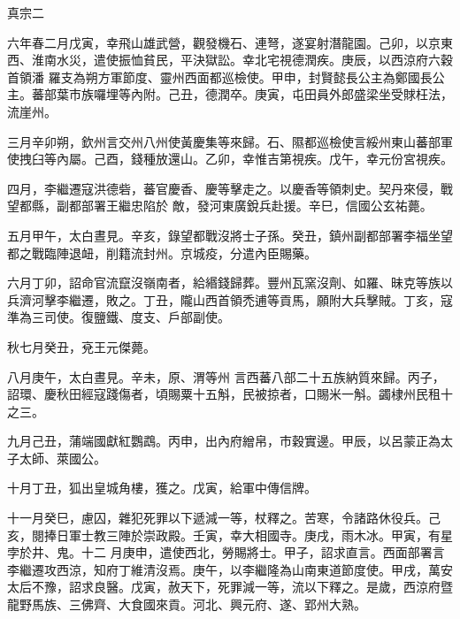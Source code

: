 
\begin{pinyinscope}

 真宗二



 六年春二月戊寅，幸飛山雄武營，觀發機石、連弩，遂宴射潛龍園。己卯，以京東西、淮南水災，遣使振恤貧民，平決獄訟。幸北宅視德潤疾。庚辰，以西涼府六穀首領潘
 羅支為朔方軍節度、靈州西面都巡檢使。甲申，封賢懿長公主為鄭國長公主。蕃部葉市族囉埋等內附。己丑，德潤卒。庚寅，屯田員外郎盛梁坐受賕枉法，流崖州。



 三月辛卯朔，欽州言交州八州使黃慶集等來歸。石、隰都巡檢使言綏州東山蕃部軍使拽臼等內屬。己酉，錢種放還山。乙卯，幸惟吉第視疾。戊午，幸元份宮視疾。



 四月，李繼遷寇洪德砦，蕃官慶香、慶等擊走之。以慶香等領刺史。契丹來侵，戰望都縣，副都部署王繼忠陷於
 敵，發河東廣銳兵赴援。辛巳，信國公玄祐薨。



 五月甲午，太白晝見。辛亥，錄望都戰沒將士子孫。癸丑，鎮州副都部署李福坐望都之戰臨陣退衄，削籍流封州。京城疫，分遣內臣賜藥。



 六月丁卯，詔命官流竄沒嶺南者，給緡錢歸葬。豐州瓦窯沒劑、如羅、昧克等族以兵濟河擊李繼遷，敗之。丁丑，隴山西首領禿逋等貢馬，願附大兵擊賊。丁亥，寇準為三司使。復鹽鐵、度支、戶部副使。



 秋七月癸丑，兗王元傑薨。



 八月庚午，太白晝見。辛未，原、渭等州
 言西蕃八部二十五族納質來歸。丙子，詔環、慶秋田經寇踐傷者，頃賜粟十五斛，民被掠者，口賜米一斛。蠲棣州民租十之三。



 九月己丑，蒲端國獻紅鸚鵡。丙申，出內府繒帛，市穀實邊。甲辰，以呂蒙正為太子太師、萊國公。



 十月丁丑，狐出皇城角樓，獲之。戊寅，給軍中傳信牌。



 十一月癸巳，慮囚，雜犯死罪以下遞減一等，杖釋之。苦寒，令諸路休役兵。己亥，閱捧日軍士教三陣於崇政殿。壬寅，幸大相國寺。庚戌，雨木冰。甲寅，有星孛於井、鬼。十二
 月庚申，遣使西北，勞賜將士。甲子，詔求直言。西面部署言李繼遷攻西涼，知府丁維清沒焉。庚午，以李繼隆為山南東道節度使。甲戌，萬安太后不豫，詔求良醫。戊寅，赦天下，死罪減一等，流以下釋之。是歲，西涼府暨龍野馬族、三佛齊、大食國來貢。河北、興元府、遂、郢州大熟。




\end{pinyinscope}
